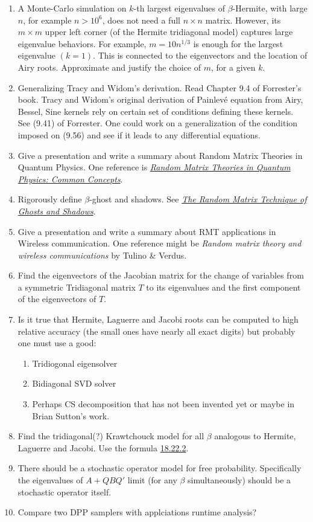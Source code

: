 \documentclass{article}
\begin{document}
\begin{enumerate}
    \item A Monte-Carlo simulation on $k$-th largest eigenvalues of $\beta$-Hermite, with large $n$, for example $n>10^6$, does not need a full $n\times n$ matrix. However, its $m\times m$ upper left corner (of the Hermite tridiagonal model) captures large eigenvalue behaviors. For example, $m=10 n^{1/3}$ is enough for the largest eigenvalue $(k=1)$. This is connected to the eigenvectors and the location of Airy roots. Approximate and justify the choice of $m$, for a given $k$. 
    \item Generalizing Tracy and Widom's derivation. Read Chapter 9.4 of Forrester's book. Tracy and Widom's original derivation of Painlev{\'e} equation from Airy, Bessel, Sine kernels rely on certain set of conditions defining these kernels. See (9.41) of Forrester. One could work on a generalization of the condition imposed on (9.56) and see if it leads to any differential equations. 
    \item Give a presentation and write a summary about Random Matrix Theories in Quantum Physics. One reference is \href{http://arxiv.org/abs/cond-mat/9707301}{\emph{\color{blue}Random Matrix Theories in Quantum Physics: Common Concepts}}.
    \item Rigorously define $\beta$-ghost and shadows. See \href{https://math.mit.edu/~edelman/publications/random_matrix_technique.pdf}{\emph{\color{blue}The Random Matrix Technique of Ghosts and Shadows}}. 
    \item Give a presentation and write a summary about RMT applications in Wireless communication. One reference might be \emph{Random matrix theory and wireless communications} by Tulino \& Verdus.
    \item Find the eigenvectors of the Jacobian matrix for the change of variables from a symmetric Tridiagonal matrix $T$ to its eigenvalues and the first component of the eigenvectors of $T$.
    \item Is it true that Hermite, Laguerre and Jacobi roots can be computed to high relative accuracy (the small ones have nearly all exact digits) but probably one must use a good: 
    \begin{enumerate}
        \item Tridiogonal eigensolver
        \item Bidiagonal SVD solver
        \item Perhaps CS decomposition that has not been invented yet or maybe in Brian Sutton's work.
    \end{enumerate}
    \item Find the tridiagonal(?) Krawtchouck model for all $\beta$ analogous to Hermite, Laguerre and Jacobi. Use the formula \href{http://dlmf.nist.gov/18.22#E2}{\color{blue}18.22.2}. 
    \item There should be a stochastic operator model for free probability. Specifically the eigenvalues of $A+QBQ'$ limit (for any $\beta$ simultaneously) should be a stochastic operator itself.
    \item Compare two DPP samplers with applciations runtime analysis?
\end{enumerate}
\end{document}
